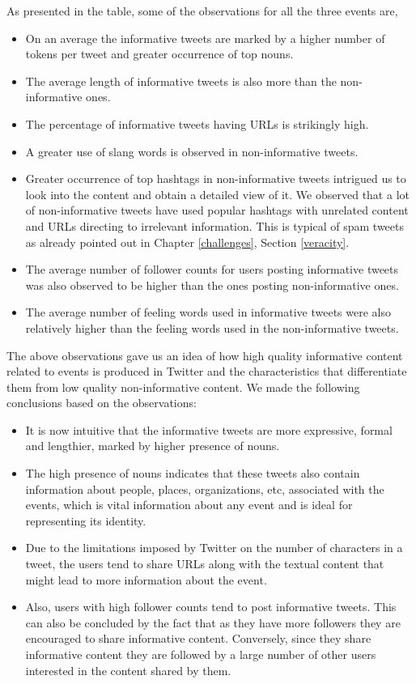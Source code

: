 As presented in the table, some of the observations for all the three events are, 

\begin{itemize}
\item On an average the informative tweets are marked by a higher number of tokens per tweet and greater occurrence of top nouns. 
\item The average length of informative tweets is also more than the non-informative ones. 
\item The percentage of informative tweets having URLs is strikingly high. 
\item A greater use of slang words is observed in non-informative tweets. 
\item Greater occurrence of top hashtags in non-informative tweets intrigued us to look into the content and obtain a detailed view of it. We observed that a lot of non-informative tweets have used popular hashtags with unrelated content and URLs directing to irrelevant information. This is typical of spam tweets as already pointed out in Chapter \ref{challenges}, Section \ref{veracity}. 
\item The average number of follower counts for users posting informative tweets was also observed to be higher than the ones posting non-informative ones. 
\item The average number of feeling words used in informative tweets were also relatively higher than the feeling words used in the non-informative tweets. 
\end{itemize}

The above observations gave us an idea of how high quality informative content related to events is produced in Twitter and the characteristics that differentiate them from low quality non-informative content. We made the following conclusions based on the observations:
\begin{itemize}
\item It is now intuitive that the informative tweets are more expressive, formal and lengthier, marked by higher presence of nouns. 
\item The high presence of nouns indicates that these tweets also contain information about people, places, organizations, etc, associated with the events, which is vital information about any event and is ideal for representing its identity. 
\item Due to the limitations imposed by Twitter on the number of characters in a tweet, the users tend to share URLs along with the textual content that might lead to more information about the event. 
\item Also, users with high follower counts tend to post informative tweets. This can also be concluded by the fact that as they have more followers they are encouraged to share informative content. Conversely, since they share informative content they are followed by a large number of other users interested in the content shared by them.
\end{itemize}


